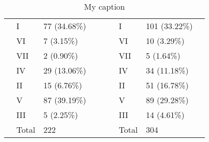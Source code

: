 \begin{table}[]
{\begin{tabular}{|l|l|l|l|l|l|l|l|l|}
 & I & 77 (34.68\%) &  &  &  & I & 101 (33.22\%) &  \\ \cline{2-3} \cline{7-8}
 & VI & 7 (3.15\%) &  &  &  & VI & 10 (3.29\%) &  \\ \cline{2-3} \cline{7-8}
 & VII & 2 (0.90\%) &  &  &  & VII & 5 (1.64\%) &  \\ \cline{2-3} \cline{7-8}
 & IV & 29 (13.06\%) &  &  &  & IV & 34 (11.18\%) &  \\ \cline{2-3} \cline{7-8}
 & II & 15 (6.76\%) &  &  &  & II & 51 (16.78\%) &  \\ \cline{2-3} \cline{7-8}
 & V & 87 (39.19\%) &  &  &  & V & 89 (29.28\%) &  \\ \cline{2-3} \cline{7-8}
 & III & 5 (2.25\%) &  &  &  & III & 14 (4.61\%) &  \\ \cline{2-3} \cline{7-8}
 & Total & 222 &  &  &  & Total & 304 &  \\ \cline{1-4} \cline{6-9}
\end{tabular}
}
\caption{My caption}
\label{my-label}
\end{table}


\newpage
